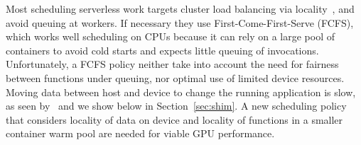 Most scheduling serverless work targets cluster load balancing via locality~\cite{faaslb-hpdc22,kaffes_hermod_2022,abdi2023palette,package-cristina-19}, and avoid queuing at workers.
If necessary they use First-Come-First-Serve (FCFS), which works well scheduling on CPUs because it can rely on a large pool of containers to avoid cold starts and expects little queuing of invocations.
Unfortunately, a FCFS policy neither take into account the need for fairness between functions under queuing, nor optimal use of limited device resources.
Moving data between host and device to change the running application is slow, as seen by~\cite{yu2019automatic, hong2017gpu} and we show below in Section~\ref{sec:shim}.
A new scheduling policy that considers locality of data on device and locality of functions in a smaller container warm pool are needed for viable GPU performance.




